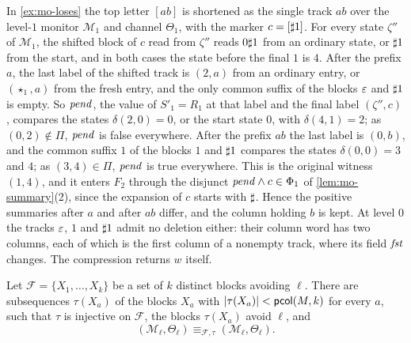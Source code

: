 \begin{example}\label{ex:mo-loses-fields}
In \cref{ex:mo-loses} the top letter $[ab]$ is shortened as the single track
$ab$ over the level-$1$ monitor $\mathcal M_1$ and channel $\Theta_1$, with the
marker $c=[\sharp1]$. For every state $\zeta''$ of $\mathcal M_1$, the shifted block
of $c$ read from $\zeta''$ reads $0\sharp1$ from an ordinary state, or $\sharp1$
from the start, and in both cases the state before the final $1$ is $4$. After
the prefix $a$, the last label of the shifted track is $(2,a)$ from an ordinary
entry, or $(\star_1,a)$ from the fresh entry, and the only common suffix of the
blocks $\varepsilon$ and $\sharp1$ is empty. So $\mathit{pend}$, the value of
$S'_1=R_1$ at that label and the final label $(\zeta'',c)$, compares the states
$\delta(2,0)=0$, or the start state $0$, with $\delta(4,1)=2$; as
$(0,2)\notin\Pi$, $\mathit{pend}$ is false everywhere. After the prefix $ab$ the last
label is $(0,b)$, and the common suffix $1$ of the blocks $1$ and $\sharp1$
compares the states $\delta(0,0)=3$ and $4$; as $(3,4)\in\Pi$, $\mathit{pend}$ is true
everywhere. This is the original witness $(1,4)$, and it enters $F_2$ through
the disjunct $\mathit{pend}\land c\in\Phi_1$ of \cref{lem:mo-summary}(2), since the
expansion of $c$ starts with $\sharp$. Hence the positive summaries after $a$ and
after $ab$ differ, and the column holding $b$ is kept. At level $0$ the tracks
$\varepsilon$, $1$ and $\sharp1$ admit no deletion either: their column word has two
columns, each of which is the first column of a nonempty track, where its field
$\mathit{fst}$ changes. The compression returns $w$ itself.
\end{example}

\begin{lemma}\label{lem:mo-columns}
Let $\mathcal F=\{X_1,\ldots,X_k\}$ be a set of $k$ distinct blocks avoiding
$\ell$. There are subsequences $\tau(X_a)$ of the blocks $X_a$ with
$\lvert \tau(X_a)\rvert<\mathsf{pcol}(M,k)$ for every $a$, such that $\tau$ is injective on
$\mathcal F$, the blocks $\tau(X_a)$ avoid $\ell$, and
\[
 (\mathcal M_\ell,\Theta_\ell)\equiv_{\mathcal F,\tau}(\mathcal M_\ell,\Theta_\ell).
\]
\end{lemma}

